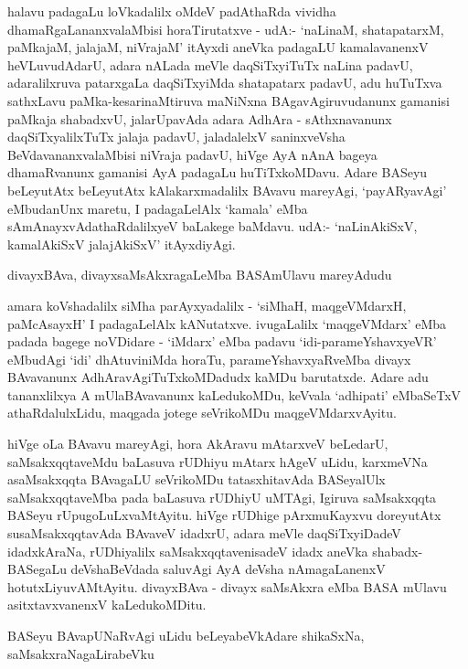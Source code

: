 halavu padagaLu loVkadalilx oMdeV padAthaRda vividha dhamaRgaLananxvalaMbisi horaTirutatxve - udA:- `naLinaM, shatapatarxM, paMkajaM, jalajaM, niVrajaM' itAyxdi aneVka padagaLU kamalavanenxV heVLuvudAdarU, adara nALada meVle daqSiTxyiTuTx naLina padavU, adaralilxruva patarxgaLa daqSiTxyiMda shatapatarx padavU, adu huTuTxva sathxLavu paMka-kesarinaMtiruva maNiNxna BAgavAgiruvudanunx gamanisi paMkaja shabadxvU, jalarUpavAda adara AdhAra - sAthxnavanunx daqSiTxyalilxTuTx jalaja padavU, jaladalelxV saninxveVsha BeVdavananxvalaMbisi niVraja padavU, hiVge AyA nAnA bageya dhamaRvanunx gamanisi AyA padagaLu huTiTxkoMDavu. Adare BASeyu beLeyutAtx beLeyutAtx kAlakarxmadalilx BAvavu mareyAgi, `payARyavAgi' eMbudanUnx maretu, I padagaLelAlx `kamala' eMba sAmAnayxvAdathaRdalilxyeV baLakege baMdavu. udA:- `naLinAkiSxV, kamalAkiSxV jalajAkiSxV' itAyxdiyAgi.

divayxBAva, divayxsaMsAkxragaLeMba BASAmUlavu mareyAdudu

amara koVshadalilx siMha parAyxyadalilx - `siMhaH, maqgeVMdarxH, paMcAsayxH' I padagaLelAlx kANutatxve. ivugaLalilx `maqgeVMdarx' eMba padada bagege noVDidare - `iMdarx' eMba padavu `idi-parameYshavxyeVR' eMbudAgi `idi' dhAtuviniMda horaTu, parameYshavxyaRveMba divayx BAvavanunx AdhAravAgiTuTxkoMDadudx kaMDu barutatxde. Adare adu tananxlilxya A mUlaBAvavanunx kaLedukoMDu, keVvala `adhipati' eMbaSeTxV athaRdalulxLidu, maqgada jotege seVrikoMDu maqgeVMdarxvAyitu.

hiVge oLa BAvavu mareyAgi, hora AkAravu mAtarxveV beLedarU, saMsakxqqtaveMdu baLasuva rUDhiyu mAtarx hAgeV uLidu, karxmeVNa asaMsakxqqta BAvagaLU seVrikoMDu tatasxhitavAda BASeyalUlx saMsakxqqtaveMba pada baLasuva rUDhiyU uMTAgi, Igiruva saMsakxqqta BASeyu rUpugoLuLxvaMtAyitu. hiVge rUDhige pArxmuKayxvu doreyutAtx susaMsakxqqtavAda BAvaveV idadxrU, adara meVle daqSiTxyiDadeV idadxkAraNa, rUDhiyalilx saMsakxqqtavenisadeV idadx aneVka shabadx-BASegaLu deVshaBeVdada saluvAgi AyA deVsha nAmagaLanenxV hotutxLiyuvAMtAyitu. divayxBAva - divayx saMsAkxra eMba BASA mUlavu asitxtavxvanenxV kaLedukoMDitu.

BASeyu BAvapUNaRvAgi uLidu beLeyabeVkAdare shikaSxNa, saMsakxraNagaLirabeVku

